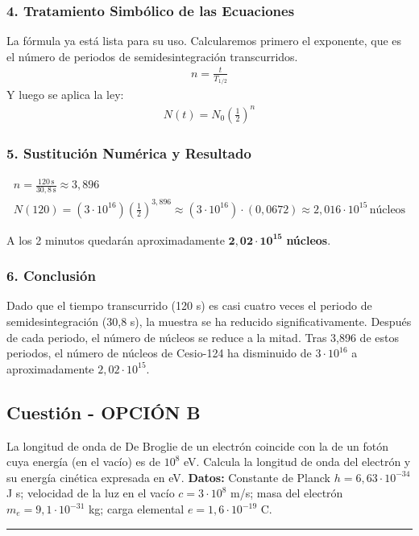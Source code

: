 \subsubsection*{4. Tratamiento Simbólico de las Ecuaciones}
La fórmula ya está lista para su uso. Calcularemos primero el exponente, que es el número de periodos de semidesintegración transcurridos.
\begin{gather}
    n = \frac{t}{T_{1/2}}
\end{gather}
Y luego se aplica la ley:
\begin{gather}
    N(t) = N_0 \left(\frac{1}{2}\right)^{n}
\end{gather}

\subsubsection*{5. Sustitución Numérica y Resultado}
\begin{gather}
    n = \frac{120 \, \text{s}}{30,8 \, \text{s}} \approx 3,896 \\
    N(120) = (3 \cdot 10^{16}) \left(\frac{1}{2}\right)^{3,896} \approx (3 \cdot 10^{16}) \cdot (0,0672) \approx 2,016 \cdot 10^{15} \, \text{núcleos}
\end{gather}
\begin{cajaresultado}
    A los 2 minutos quedarán aproximadamente $\boldsymbol{2,02 \cdot 10^{15}}$ \textbf{núcleos}.
\end{cajaresultado}

\subsubsection*{6. Conclusión}
\begin{cajaconclusion}
Dado que el tiempo transcurrido (120 s) es casi cuatro veces el periodo de semidesintegración (30,8 s), la muestra se ha reducido significativamente. Después de cada periodo, el número de núcleos se reduce a la mitad. Tras 3,896 de estos periodos, el número de núcleos de Cesio-124 ha disminuido de $3 \cdot 10^{16}$ a aproximadamente $2,02 \cdot 10^{15}$.
\end{cajaconclusion}

\newpage

\subsection{Cuestión - OPCIÓN B}
\label{subsec:6B_2011_sep_ext}

\begin{cajaenunciado}
La longitud de onda de De Broglie de un electrón coincide con la de un fotón cuya energía (en el vacío) es de $10^{8}$ eV. Calcula la longitud de onda del electrón y su energía cinética expresada en eV.
\textbf{Datos:} Constante de Planck $h=6,63\cdot10^{-34}$ J s; velocidad de la luz en el vacío $c=3\cdot10^{8}$ m/s; masa del electrón $m_{e}=9,1\cdot10^{-31}$ kg; carga elemental $e=1,6\cdot10^{-19}$ C.
\end{cajaenunciado}
\hrule

